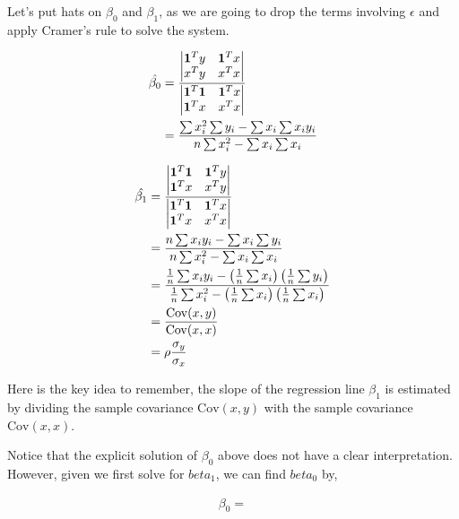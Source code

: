 \documentclass{amsart}
\theoremstyle{plain}
\numberwithin{equation}{section}
\begin{document}
Let's put hats on $\beta_0$ and 
$\beta_1$, as we are going to drop the 
terms involving $\epsilon$ and apply 
Cramer's rule to solve the system.

\begin{align*}
\hat{\beta_0} &= \frac{
\left|
\begin{matrix}
{\bf 1}^Ty & {\bf 1}^Tx\\
x^Ty & x^Tx
\end{matrix}
\right|}
{
\left|
\begin{matrix}
{\bf 1}^T{\bf 1} & {\bf 1}^Tx\\
{\bf 1}^Tx & x^Tx
\end{matrix}
\right|}\\
&=\frac{\sum{x_i^2}\sum{y_i}-\sum{x_i}\sum{x_i y_i}}{n\sum{x_i^2}-\sum{x_i}\sum{x_i}}
\end{align*}

\begin{align*}
\hat{\beta_1} &= \frac{
\left|
\begin{matrix}
{\bf 1}^T{\bf 1} & {\bf 1}^Ty\\
{\bf 1}^Tx & x^Ty
\end{matrix}
\right|}
{
\left|
\begin{matrix}
{\bf 1}^T{\bf 1} & {\bf 1}^Tx\\
{\bf 1}^Tx & x^Tx
\end{matrix}
\right|}\\ 
& = \frac{n \sum{x_i y_i} - \sum{x_i}\sum{y_i}}
{n\sum{x_i^2}-\sum{x_i}\sum{x_i}}\\
& = \frac{ \frac{1}{n}\sum{x_i y_i} - 
\left(\frac{1}{n}\sum{x_i}\right)\left(\frac{1}{n}\sum{y_i}\right)}
{\frac{1}{n}\sum{x_i^2}-
\left(\frac{1}{n}\sum{x_i}\right)\left(\frac{1}{n}\sum{x_i}\right)}\\
& = \frac{\mathrm{Cov}(x, y)}{\mathrm{Cov}(x, x)}\\
& = \rho \frac{\sigma_y}{\sigma_x}
\end{align*}

Here is the key idea to remember, the slope of the regression line $\beta_1$ 
is estimated by dividing the sample covariance $\mathrm{Cov}(x,y)$ with the 
sample covariance $\mathrm{Cov}(x, x)$.

Notice that the explicit solution of $\beta_0$ above does not 
have a clear interpretation. However, given we first solve for 
$beta_1$, we can find $beta_0$ by,

\begin{align*}
\beta_0 = 
\end{align*}
\end{document}
